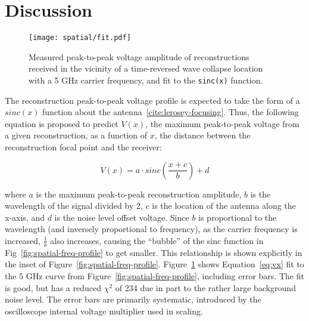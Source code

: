 \section{Discussion}
\label{sec:spatial-profile-discussion}

\begin{figure}[t!]
\texttt{[image: spatial/fit.pdf]}
\caption{Measured peak-to-peak voltage amplitude of reconstructions received in the
vicinity of a time-reversed wave collapse location with a 5 GHz carrier
frequency, and fit to the \texttt{sinc(x)} function.}
\label{fig:spatial-error-fit}
\end{figure}

The reconstruction peak-to-peak voltage profile is expected to take the form of a $sinc(x)$ function about the antenna~\ref{cite:lerosey-focusing}. Thus, the following equation is proposed to predict $V(x)$, the maximum peak-to-peak voltage from a given reconstruction, as a function of $x$, the distance between the reconstruction focal point and the receiver:

\begin{equation}
\label{eq:vx}
V(x) = a\cdot sinc\left(\frac{x+c}{b}\right) + d
\end{equation}

where $a$ is the maximum peak-to-peak reconstruction amplitude, $b$ is the wavelength of the signal divided by 2, $c$ is the location of the antenna along the x-axis, and $d$ is the noise level
offset voltage. Since $b$ is proportional to the wavelength (and inversely proportional
to frequency), as the carrier frequency is increased,  $\frac{1}{b}$ also increases, causing the ``bubble'' of the sinc function in Fig~\ref{fig:spatial-freq-profile} to get smaller. This relationship is shown explicitly in the inset of Figure~\ref{fig:spatial-freq-profile}. Figure~\ref{fig:spatial-error-fit} shows Equation~\ref{eq:vx} fit to the 5 GHz curve from Figure~\ref{fig:spatial-freq-profile}, including error bars. The fit is good, but has a reduced $\chi^2$ of 234 due in part to the rather large background noise level. The error bars are primarily systematic, introduced by the oscilloscope internal voltage multiplier used in scaling.
